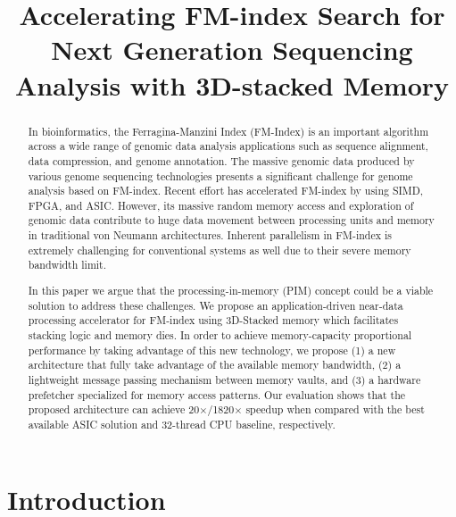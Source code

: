 \documentclass[9pt,conference]{IEEEtran}
\begin{document}
\title{Accelerating FM-index Search for Next Generation Sequencing Analysis with 3D-stacked Memory}
\maketitle

\begin{abstract}
In bioinformatics, the Ferragina-Manzini Index (FM-Index) is an important algorithm across a wide range of genomic data analysis applications such as sequence alignment, data compression, and genome annotation. The massive genomic data produced by various genome sequencing technologies presents a significant challenge for genome analysis based on FM-index. 
Recent effort has accelerated FM-index by using SIMD, FPGA, and ASIC. However, its massive random memory access and exploration of genomic data contribute to huge data movement between processing units and memory in traditional von Neumann architectures.
Inherent parallelism in FM-index is extremely challenging for conventional systems as well due to their severe memory bandwidth limit.

In this paper we argue that the processing-in-memory (PIM) concept could be a viable solution to address these challenges.
We propose an application-driven near-data processing accelerator for FM-index using 3D-Stacked memory which facilitates stacking logic and memory dies. 
In order to achieve memory-capacity proportional performance by taking advantage of this new technology, we propose (1) a new architecture that fully take advantage of the available memory bandwidth, (2) a lightweight message passing mechanism between memory vaults, and (3) a hardware prefetcher specialized for memory access patterns. 
Our evaluation shows that the proposed architecture can achieve 20$\times$/1820$\times$ speedup when compared with the best available ASIC solution and 32-thread CPU baseline, respectively.
\end{abstract}

\section{Introduction}
\end{document}
